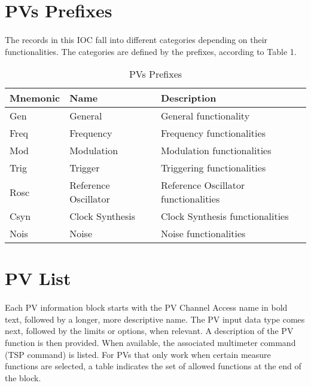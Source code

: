 \documentclass[openany]{article}
\begin{document}
\section{PVs Prefixes}

	\paragraph{} The records in this IOC fall into different categories depending on their functionalities. The categories are defined by the prefixes, according to Table 1.

	\begin{table}[!h]
		\center
		\caption{PVs Prefixes}
		\begin{tabular}{m{3cm} m{3cm} m{7cm}}
			\hline
			\bfseries Mnemonic & \bfseries Name & \bfseries Description \\ \hline
			Gen & General & General functionality \\ \hline
			Freq & Frequency & Frequency functionalities \\ \hline
			Mod & Modulation & Modulation functionalities \\ \hline
			Trig & Trigger & Triggering functionalities \\ \hline
			Rosc & Reference Oscillator & Reference Oscillator functionalities \\ \hline
			Csyn & Clock Synthesis & Clock Synthesis functionalities\\ \hline
			Nois & Noise  & Noise functionalities \\ \hline

		\end{tabular}
	\end{table}

\section{PV List}

		\paragraph{} Each PV information block starts with the PV Channel Access name in bold text, followed by a longer, more descriptive name. The PV input data type comes next, followed by the limits or options, when relevant. A description of the PV function is then provided. When available, the associated multimeter command (TSP command) is listed. For PVs that only work when certain measure functions are selected, a table indicates the set of allowed functions at the end of the block.
\end{document}
